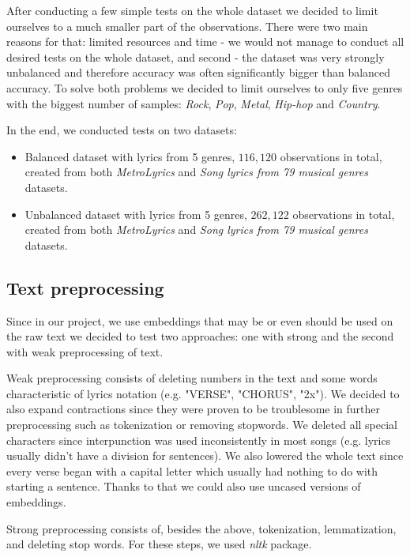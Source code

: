 After conducting a few simple tests on the whole dataset we decided to limit ourselves to a much smaller part of the observations. There were two main reasons for that: limited resources and time - we would not manage to conduct all desired tests on the whole dataset, and second - the dataset was very strongly unbalanced and therefore accuracy was often significantly bigger than balanced accuracy. To solve both problems we decided to limit ourselves to only five genres with the biggest number of samples: \textit{Rock}, \textit{Pop}, \textit{Metal}, \textit{Hip-hop} and \textit{Country}.

In the end, we conducted tests on two datasets:
\begin{itemize}
    \item Balanced dataset with lyrics from 5 genres, $116,120$ observations in total, created from both \textit{MetroLyrics} and \textit{Song lyrics from 79 musical genres} datasets.

    \item Unbalanced dataset with lyrics from 5 genres, $262,122$ observations in total, created from both \textit{MetroLyrics} and \textit{Song lyrics from 79 musical genres} datasets.
\end{itemize}

\subsection{Text preprocessing}

Since in our project, we use embeddings that may be or even should be used on the raw text we decided to test two approaches: one with strong and the second with weak preprocessing of text.

Weak preprocessing consists of deleting numbers in the text and some words characteristic of lyrics notation (e.g. "VERSE", "CHORUS", "2x"). We decided to also expand contractions since they were proven to be troublesome in further preprocessing such as tokenization or removing stopwords. We deleted all special characters since interpunction was used inconsistently in most songs (e.g. lyrics usually didn't have a division for sentences). We also lowered the whole text since every verse began with a capital letter which usually had nothing to do with starting a sentence. Thanks to that we could also use uncased versions of embeddings.

Strong preprocessing consists of, besides the above, tokenization, lemmatization, and deleting stop words. For these steps, we used \textit{nltk} package.



